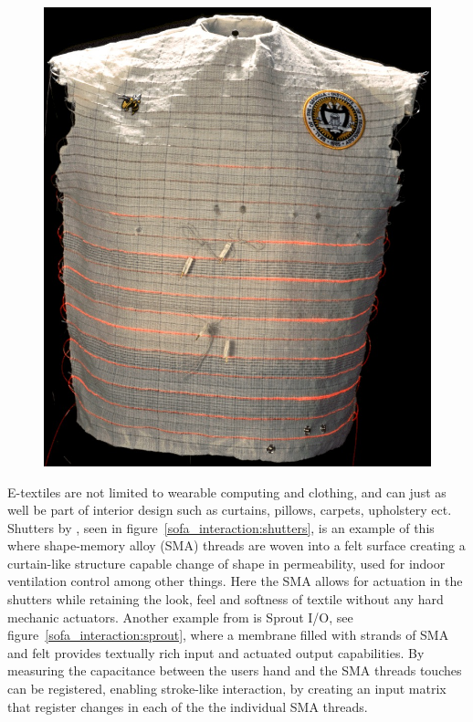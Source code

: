 \begin{figure}[h]
  \centering
  \begin{minipage}[b]{.7\textwidth}
    \centering
    \includegraphics[width=.5\linewidth]{figures/touch/wearable_motherboard}
  \label{sofa_interaction:wearable_motherboard}
  \end{minipage}
\end{figure}

E-textiles are not limited to wearable computing and clothing, and can just as well be part of interior design such as curtains, pillows, carpets, upholstery ect.
Shutters by \citet{coelho2009shutters}, seen in figure~\ref{sofa_interaction:shutters}, is an example of this where shape-memory alloy (SMA) threads are woven into a felt surface creating a curtain-like structure capable change of shape in permeability, used for indoor ventilation control among other things.
Here the SMA allows for actuation in the shutters while retaining the look, feel and softness of textile without any hard mechanic actuators.  
Another example from \citet{coelho2008sprout} is Sprout I/O, see figure~\ref{sofa_interaction:sprout}, where a membrane filled with strands of SMA and felt provides textually rich input and actuated output capabilities.
By measuring the capacitance between the users hand and the SMA threads touches can be registered, enabling stroke-like interaction, by creating an input matrix that register changes in each of the the individual SMA threads.


